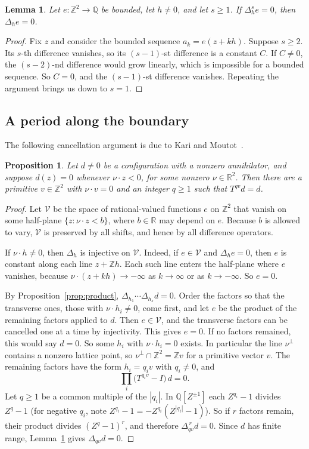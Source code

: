 \documentclass[11pt,a4paper,reqno]{amsart}
\newtheorem{proposition}[theorem]{Proposition}
\newtheorem{lemma}[theorem]{Lemma}
\theoremstyle{definition}
\theoremstyle{remark}
\newcommand{\Z}{\mathbb Z}
\newcommand{\Q}{\mathbb Q}
\newcommand{\R}{\mathbb R}
\newcommand{\De}{\Delta}
\numberwithin{equation}{section}
\begin{document}
\begin{lemma}\label{lem:repeated}
Let $e\colon\Z^2\to\Q$ be bounded, let $h\ne0$, and let $s\ge1$. If $\De_h^se=0$, then $\De_he=0$.
\end{lemma}

\begin{proof}
Fix $z$ and consider the bounded sequence $a_k=e(z+kh)$. Suppose $s\ge2$. Its $s$-th difference vanishes, so its $(s-1)$-st difference is a constant $C$. If $C\ne0$, the $(s-2)$-nd difference would grow linearly, which is impossible for a bounded sequence. So $C=0$, and the $(s-1)$-st difference vanishes. Repeating the argument brings us down to $s=1$.
\end{proof}

\subsection{A period along the boundary}\label{ssec:tangent}
The following cancellation argument is due to Kari and Moutot~\cite[Proposition~13 and the proof of Lemma~17]{KM}.

\begin{proposition}\label{prop:tangent-period}
Let $d\ne0$ be a configuration with a nonzero annihilator, and suppose $d(z)=0$ whenever $\nu\cdot z<0$, for some nonzero $\nu\in\R^2$. Then there are a primitive $v\in\Z^2$ with $\nu\cdot v=0$ and an integer $q\ge1$ such that $T^{qv}d=d$.
\end{proposition}

\begin{proof}
Let $\mathcal V$ be the space of rational-valued functions $e$ on $\Z^2$ that vanish on some half-plane $\{z:\nu\cdot z<b\}$, where $b\in\R$ may depend on $e$. Because $b$ is allowed to vary, $\mathcal V$ is preserved by all shifts, and hence by all difference operators.

If $\nu\cdot h\ne0$, then $\De_h$ is injective on $\mathcal V$. Indeed, if $e\in\mathcal V$ and $\De_he=0$, then $e$ is constant along each line $z+\Z h$. Each such line enters the half-plane where $e$ vanishes, because $\nu\cdot(z+kh)\to-\infty$ as $k\to\infty$ or as $k\to-\infty$. So $e=0$.

By Proposition~\ref{prop:product}, $\De_{h_1}\cdots\De_{h_s}d=0$. Order the factors so that the transverse ones, those with $\nu\cdot h_i\ne0$, come first, and let $e$ be the product of the remaining factors applied to $d$. Then $e\in\mathcal V$, and the transverse factors can be cancelled one at a time by injectivity. This gives $e=0$. If no factors remained, this would say $d=0$. So some $h_i$ with $\nu\cdot h_i=0$ exists. In particular the line $\nu^\perp$ contains a nonzero lattice point, so $\nu^\perp\cap\Z^2=\Z v$ for a primitive vector $v$. The remaining factors have the form $h_i=q_iv$ with $q_i\ne0$, and
\[
 \prod_i\bigl(T^{q_iv}-I\bigr)\,d=0.
\]
Let $q\ge1$ be a common multiple of the $|q_i|$. In $\Q[Z^{\pm1}]$ each $Z^{q_i}-1$ divides $Z^q-1$ (for negative $q_i$, note $Z^{q_i}-1=-Z^{q_i}(Z^{|q_i|}-1)$). So if $r$ factors remain, their product divides $(Z^q-1)^r$, and therefore $\De_{qv}^{\,r}d=0$. Since $d$ has finite range, Lemma~\ref{lem:repeated} gives $\De_{qv}d=0$.
\end{proof}
\end{document}
